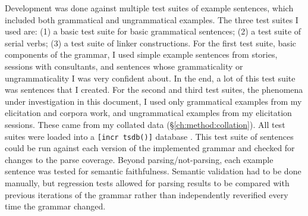 
Development was done against multiple test suites of example sentences, which included both grammatical and ungrammatical examples. The three test suites I used are: (1) a basic test suite for basic grammatical sentences; (2) a test suite of serial verbs; (3) a test suite of linker constructions. For the first test suite, basic components of the grammar, I used simple example sentences from stories, sessions with consultants, and sentences whose grammaticality or ungrammaticality I was very confident about. In the end, a lot of this test suite was sentences that I created. For the second and third test suites, the phenomena under investigation in this document, I used only grammatical examples from my elicitation and corpora work, and ungrammatical examples from my elicitation sessions. These came from my collated data (\S\ref{ch:method:collation}).  All test suites were loaded into a \texttt{[incr tsdb()]} database \citep{oepen2001}. This test suite of sentences could be run against each version of the implemented grammar and checked for changes to the parse coverage. Beyond parsing/not-parsing, each example sentence was tested for semantic faithfulness. Semantic validation had to be done manually, but regression tests allowed for parsing results to be compared with previous iterations of the grammar rather than independently reverified every time the grammar changed.

